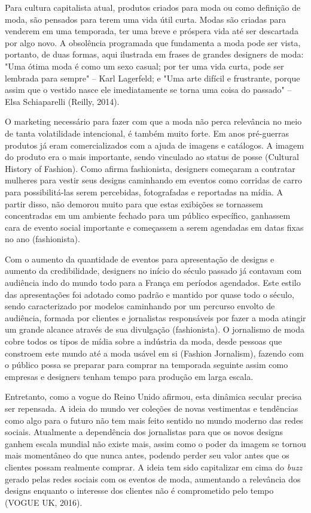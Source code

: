 \documentclass[12pt]{report}
\begin{document}
Para cultura capitalista atual, produtos criados para moda ou como definição de moda, são pensados para terem uma vida útil curta. Modas são criadas para venderem em uma temporada, ter uma breve e próspera vida até ser descartada por algo novo. A obsolência programada que fundamenta a moda pode ser vista, portanto, de duas formas, aqui ilustrada em frases de grandes designers de moda: "Uma ótima moda é como um sexo casual; por ter uma vida curta, pode ser lembrada para sempre" -- Karl Lagerfeld; e "Uma arte difícil e frustrante, porque assim que o vestido nasce ele imediatamente se torna uma coisa do passado" -- Elsa Schiaparelli (Reilly, 2014).

O marketing necessário para fazer com que a moda não perca relevância no meio de tanta volatilidade intencional, é também muito forte. Em anos pré-guerras produtos já eram comercializados com a ajuda de imagens e catálogos. A imagem do produto era o mais importante, sendo vinculado ao status de posse (Cultural History of Fashion). Como afirma fashionista, designers começaram a contratar mulheres para vestir seus designs caminhando em eventos como corridas de carro para possibilitá-las serem percebidas, fotografadas e reportadas na mídia. A partir disso, não demorou muito para que estas exibições se tornassem concentradas em um ambiente fechado para um público específico, ganhassem cara de evento social importante e começassem a serem agendadas em datas fixas no ano (fashionista).

Com o aumento da quantidade de eventos para apresentação de designs e aumento da credibilidade, designers no início do século passado já contavam com audiência indo do mundo todo para a França em períodos agendados. Este estilo das apresentações foi adotado como padrão e mantido por quase todo o século, sendo caracterizado por modelos caminhando por um percurso envolto de audiência, formada por clientes e jornalistas responsáveis por fazer a moda atingir um grande alcance através de sua divulgação (fashionista). O jornalismo de moda cobre todos os tipos de mídia sobre a indústria da moda, desde pessoas que constroem este mundo até a moda usável em si (Fashion Jornalism), fazendo com o público possa se preparar para comprar na temporada seguinte assim como empresas e designers tenham tempo para produção em larga escala. 

Entretanto, como a vogue do Reino Unido afirmou, esta dinâmica secular precisa ser repensada. A ideia do mundo ver coleções de novas vestimentas e tendências como algo para o futuro não tem mais feito sentido no mundo moderno das redes sociais. Atualmente a dependência dos jornalistas para que os novos designs ganhem escala mundial não existe mais, assim como o poder da imagem se tornou mais momentâneo do que nunca antes, podendo perder seu valor antes que os clientes possam realmente comprar. 
A ideia tem sido capitalizar em cima do \textit{buzz} gerado pelas redes sociais com os eventos de moda, aumentando a relevância dos designs enquanto o interesse dos clientes não é comprometido pelo tempo (VOGUE UK, 2016).   
\end{document}
